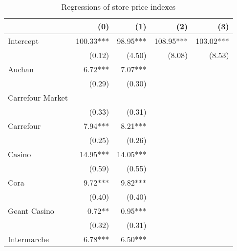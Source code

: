 \documentclass[english]{article}
\begin{document}
\begin{table}
\caption{Regressions of store price indexes}
\label{tab:reg_store_price_indexes}
\begin{threeparttable}
\begin{tabular}{lrrrr}
\toprule
\toprule
                                                        & (0)       & (1)      & (2)       & (3)        \\
\midrule
Intercept                                               & 100.33*** & 98.95*** & 108.95*** & 103.02***  \\
                                                        & (0.12)    & (4.50)   & (8.08)    & (8.53)     \\
Auchan                                                  & 6.72***   & 7.07***  &           &            \\
                                                        & (0.29)    & (0.30)   &           &            \\
Carrefour Market                                        &            \\
                                                        & (0.33)    & (0.31)   &           &            \\
Carrefour                                               & 7.94***   & 8.21***  &           &            \\
                                                        & (0.25)    & (0.26)   &           &            \\
Casino                                                  & 14.95***  & 14.05*** &           &            \\
                                                        & (0.59)    & (0.55)   &           &            \\
Cora                                                    & 9.72***   & 9.82***  &           &            \\
                                                        & (0.40)    & (0.40)   &           &            \\
Geant Casino                                            & 0.72**    & 0.95***  &           &            \\
                                                        & (0.32)    & (0.31)   &           &            \\
Intermarche                                             & 6.78***   & 6.50***  &           &            \\

\end{tabular}
\end{threeparttable}
\end{table}
\end{document}
